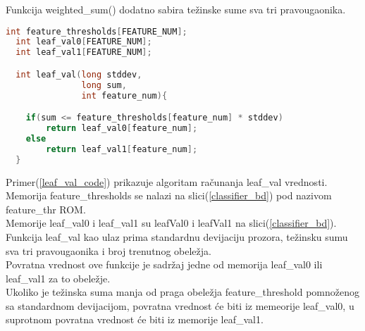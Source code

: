 Funkcija weighted\_sum() dodatno sabira težinske sume sva tri pravougaonika.

\newpage

\begin{lstlisting}[language=C++,caption={Leaf\_val u \textbf{C}-u},captionpos=b, label=leaf_val_code]
  int feature_thresholds[FEATURE_NUM];
  int leaf_val0[FEATURE_NUM];
  int leaf_val1[FEATURE_NUM];

  int leaf_val(long stddev,
               long sum,
               int feature_num){

    if(sum <= feature_thresholds[feature_num] * stddev)
        return leaf_val0[feature_num];
    else
        return leaf_val1[feature_num];
  }
\end{lstlisting}

Primer(\ref{leaf_val_code}) prikazuje algoritam računanja leaf\_val vrednosti. \\
Memorija feature\_thresholds se nalazi na slici(\ref{classifier_bd}) pod nazivom
feature\_thr ROM. \\
Memorije leaf\_val0 i leaf\_val1 su leafVal0 i leafVal1 na
slici(\ref{classifier_bd}). \\

Funkcija leaf\_val kao ulaz prima standardnu devijaciju prozora, težinsku sumu
sva tri pravougaonika i broj trenutnog obeležja. \\
Povratna vrednost ove funkcije je sadržaj jedne od memorija leaf\_val0 ili
leaf\_val1 za to obeležje. \\

Ukoliko je težinska suma manja od praga obeležja feature\_threshold
pomnoženog sa standardnom devijacijom, povratna vrednost će biti iz memeorije
leaf\_val0, u suprotnom povratna vrednost će biti iz memorije leaf\_val1.